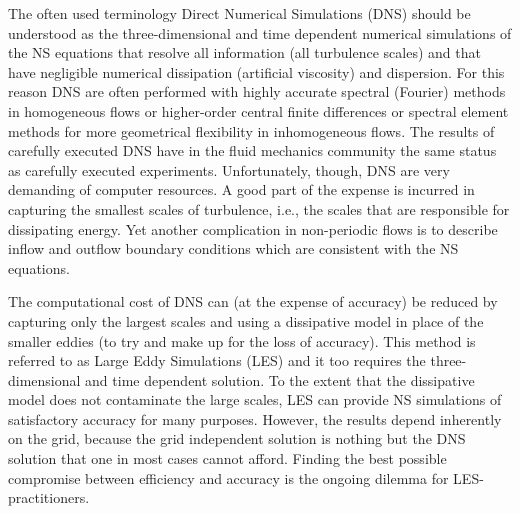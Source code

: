 

The often used terminology Direct Numerical Simulations (DNS) should be understood as the three-dimensional and time dependent numerical simulations of the NS equations that resolve all information (all turbulence scales) and that have negligible numerical dissipation (artificial viscosity) and dispersion. For this reason DNS are often performed with highly accurate spectral (Fourier) methods \cite{Canuto88} in homogeneous flows or higher-order central finite differences or spectral element methods \cite{semtex} for more geometrical flexibility in inhomogeneous flows. The results of carefully executed DNS have in the fluid mechanics community the same status as carefully executed experiments. Unfortunately, though, DNS are very demanding of computer resources. A good part of the expense is incurred in capturing the smallest scales of turbulence, i.e., the scales that are responsible for dissipating energy. Yet another complication in non-periodic flows is to describe inflow and outflow boundary conditions which are consistent with the NS equations.

The computational cost of DNS can (at the expense of accuracy) be reduced by capturing only the largest scales and using a dissipative model in place of the smaller eddies (to try and make up for the loss of accuracy). This method is referred to as Large Eddy Simulations (LES) and it too requires the three-dimensional and time dependent solution. To the extent that the dissipative model does not contaminate the large scales, LES can provide NS simulations of satisfactory accuracy for many purposes. However, the results depend inherently on the grid, because the grid independent solution is nothing but the DNS solution that one in most cases cannot afford. Finding the best possible compromise between efficiency and accuracy is the ongoing dilemma for LES-practitioners.

